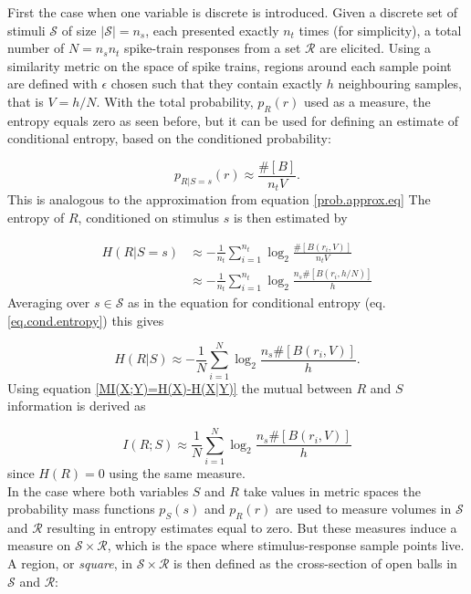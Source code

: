 \documentclass[12pt]{extarticle}
\begin{document}
\noindent
First the case when one variable is discrete is introduced. Given a
discrete set of stimuli $\mathcal{S}$ of size $|\mathcal{S}|=n_s$,
each presented exactly $n_t$ times (for simplicity), a total number of
$N=n_sn_t$ spike-train responses from a set $\mathcal{R}$ are
elicited. Using a similarity metric on the space of spike trains,
regions around each sample point are defined with $\epsilon$ chosen
such that they contain exactly $h$ neighbouring samples,
that is $V=h/N$. With the total probability, $p_R(r)$ used as a measure,
the entropy equals zero as seen before, but it can be used for
defining an estimate of conditional entropy, based on the conditioned
probability:

\begin{equation}
p_{R|S=s}(r) \approx \frac{\#[B]}{n_tV}.
\label{prob.approx.eq.2}
\end{equation}
This is analogous to the approximation from equation \ref{prob.approx.eq}
The entropy of $R$, conditioned on stimulus $s$ is then estimated by

\begin{equation}
\begin{aligned}
H(R|S=s) &\approx - \frac{1}{n_t} \sum_{i=1}^{n_t} \log_2 \frac{\#[B(r_i, V)]}{n_tV} \\
         &\approx - \frac{1}{n_t} \sum_{i=1}^{n_t} \log_2 \frac{n_s\#[B(r_i, h/N)]}{h}
\end{aligned}
\end{equation}
Averaging over $s \in \mathcal{S}$ as in the equation for conditional entropy 
(eq. \ref{eq.cond.entropy}) this gives

\begin{equation}
H(R|S) \approx - \frac{1}{N} \sum_{i=1}^{N} \log_2 \frac{n_s\#[B(r_i, V)]}{h}.
\end{equation}
Using equation \ref{MI(X;Y)=H(X)-H(X|Y)} the mutual between $R$ and $S$ information is derived as

\begin{equation}
I(R;S) \approx \frac{1}{N} \sum_{i=1}^{N} \log_2 \frac{n_s\#[B(r_i, V)]}{h}
\end{equation}
since $H(R)=0$ using the same measure.\\

\noindent
In the case where both variables $S$ and $R$ take values in metric
spaces the probability mass functions $p_S(s)$ and $p_R(r)$ are used
to measure volumes in $\mathcal{S}$ and $\mathcal{R}$ resulting in
entropy estimates equal to zero. But these measures induce a measure
on $\mathcal{S} \times \mathcal{R}$, which is the space where
stimulus-response sample points live. A region, or \textit{square}, in
$\mathcal{S} \times \mathcal{R}$ is then defined as the cross-section
of open balls in $\mathcal{S}$ and $\mathcal{R}$:
\end{document}
